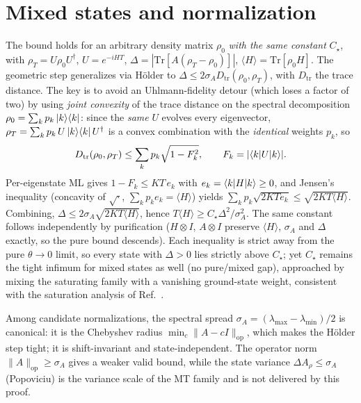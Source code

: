 \documentclass[aps,pra,twocolumn,superscriptaddress,nofootinbib,longbibliography]{revtex4-2}
\newcommand{\Ctrue}{C_{\star}}
\newcommand{\mean}[1]{\langle #1 \rangle}
\newcommand{\Tr}{\mathrm{Tr}}
\newcommand{\Dtr}{D_{\mathrm{tr}}}
\begin{document}
\section{Mixed states and normalization}
\label{sec:mixed}
The bound holds for an arbitrary density matrix $\rho_0$ \emph{with the same constant} $\Ctrue$, with
$\rho_T=U\rho_0U^\dagger$, $U=e^{-iHT}$, $\Delta=|\Tr[A(\rho_T-\rho_0)]|$, $\mean{H}=\Tr[\rho_0H]$.
The geometric step generalizes via Hölder to $\Delta\le 2\sigma_A\Dtr(\rho_0,\rho_T)$, with $\Dtr$ the trace
distance. The key is to avoid an Uhlmann-fidelity detour (which loses a factor of two) by using
\emph{joint convexity} of the trace distance on the spectral decomposition $\rho_0=\sum_k p_k\ket k\!\bra k$:
since the \emph{same} $U$ evolves every eigenvector, $\rho_T=\sum_k p_k\,U\ket k\!\bra k U^\dagger$ is a convex
combination with the \emph{identical} weights $p_k$, so
\begin{equation}
\Dtr(\rho_0,\rho_T)\le\sum_k p_k\sqrt{1-F_k^2},\qquad F_k=|\!\braket{k|U|k}\!|.
\end{equation}
Per-eigenstate ML gives $1-F_k\le K T\,e_k$ with $e_k=\braket{k|H|k}\ge0$, and Jensen's inequality (concavity
of $\sqrt{\cdot}$, $\sum_k p_k e_k=\mean H$) yields
$\sum_k p_k\sqrt{2KTe_k}\le\sqrt{2KT\mean H}$. Combining,
$\Delta\le 2\sigma_A\sqrt{2KT\mean H}$, hence $T\mean H\ge\Ctrue\Delta^2/\sigma_A^2$. The same constant
follows independently by purification ($H\!\otimes\!I$, $A\!\otimes\!I$ preserve $\mean H$, $\sigma_A$ and
$\Delta$ exactly, so the pure bound descends). Each inequality is strict away from the pure $\theta\to0$ limit,
so every state with $\Delta>0$ lies strictly above $\Ctrue$; yet $\Ctrue$ remains the tight infimum for mixed
states as well (no pure/mixed gap), approached by mixing the saturating family with a vanishing ground-state
weight, consistent with the saturation analysis of Ref.~\cite{Sonnerborn2026MLsaturate}.

Among candidate normalizations, the spectral spread $\sigma_A=(\lambda_{\max}-\lambda_{\min})/2$ is canonical:
it is the Chebyshev radius $\min_c\|A-cI\|_{\mathrm{op}}$, which makes the Hölder step tight; it is
shift-invariant and state-independent. The operator norm $\|A\|_{\mathrm{op}}\ge\sigma_A$ gives a weaker valid
bound, while the state variance $\Delta A_\rho\le\sigma_A$ (Popoviciu) is the variance scale of the MT family
and is not delivered by this proof.
\end{document}
